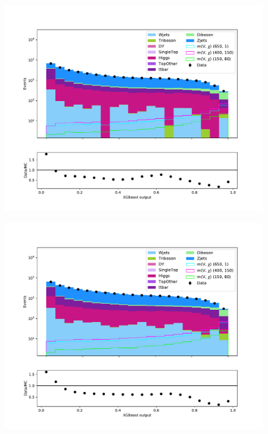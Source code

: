 \begin{figure}[H]
    \centering
        \includegraphics[width = \textwidth]{Figures/Stacked/stackedplot_BDT_Low_level_monoZ.pdf}
        \caption{}
        \label{fig:traintestscaled}
\end{figure}

\begin{figure}[H]
    \centering
        \includegraphics[width = \textwidth]{Figures/Stacked/stackedplot_BDT_High_level_monoZ.pdf}
        \caption{}
        \label{fig:traintestscaled}
\end{figure}

























